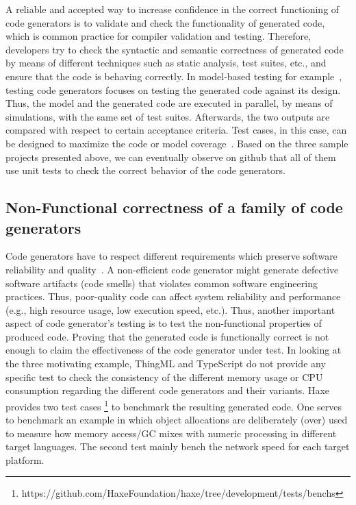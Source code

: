 A reliable and accepted way to increase confidence in the correct functioning of code generators is to validate and check the functionality of generated code, which is common practice for compiler validation and testing.
Therefore, developers try to check the syntactic and semantic correctness of generated code by means of different techniques such as static analysis, test suites, etc., and ensure that the code is behaving correctly.  In model-based testing for example~\cite{jorges2014back,stuermer2007systematic}, testing code generators focuses on testing the generated code against its design. Thus, the model and the generated code are executed in parallel, by means of simulations, with the same set of test suites. Afterwards, the two outputs are compared with respect to certain acceptance criteria. Test cases, in this case, can be designed to maximize the code or model coverage~\cite{sturmer2005overview}. 
Based on the three sample projects presented above, we can eventually observe on github that all of them use unit tests to check the correct behavior of the code generators.  

\subsection{Non-Functional  correctness of a family of code generators}


Code generators have to respect different requirements which preserve software reliability and quality~\cite{demertzi2011analyzing}. A non-efficient code generator might generate defective software artifacts (code smells) that violates common software engineering practices. Thus, poor-quality code can affect system reliability and performance (e.g., high resource usage, low execution speed, etc.). Thus, another important aspect of code generator's testing is to test the non-functional properties of produced code. Proving that the generated code is functionally correct is not enough to claim the effectiveness of the code generator under test. In looking at the three motivating example, ThingML and TypeScript do not provide any specific test to check the consistency of the different memory usage or CPU consumption regarding the different code generators and their variants. Haxe provides two test cases \footnote{https://github.com/HaxeFoundation/haxe/tree/development/tests/benchs} to benchmark the resulting generated code. One serves to benchmark an example in which object allocations are deliberately (over) used to measure how memory access/GC mixes with numeric processing in different target languages. The second test mainly bench the network speed for each target platform. 

